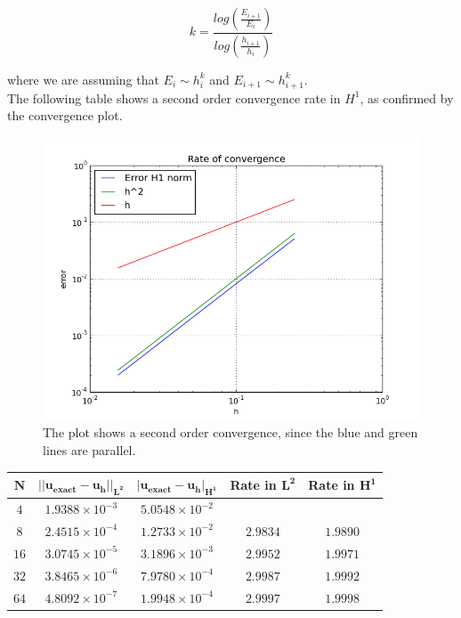 \documentclass[a4paper,11pt,openright,twoside]{book}
\begin{document}
\[
k = \frac{log(\frac{E_{i+1}}{E_i})}{log(\frac{h_{i+1}}{h_i})}
\]

where we are assuming that $E_i \sim h^k_i$ and $E_{i+1} \sim h^k_{i+1}$. \\
The following table shows a second order convergence rate in $H^1$, as confirmed by the convergence plot.

\vspace{1cm}
\begin{figure}[h!]
\centering
\includegraphics[width=\textwidth]{images/convergence_sine}
\caption{The plot shows a second order convergence, since the blue and green lines are parallel.}
\end{figure}
\vspace{1cm}

\begin{center}
\begin{tabular}{| c | c | c | c | c |}
\hline
$  \mathbf{N}$ & $ \mathbf{|| u_{exact} - u_h ||_{L^2}}$ & $  \mathbf{ | u_{exact} - u_h |_{H^1}}$ & \textbf{Rate in }  $ \mathbf{L^2}$ & \textbf{Rate in } $  \mathbf{H^1}$  \\
\hline
$ 4 $ & $1.9388 \times 10^{-3}$ & $5.0548 \times 10^{-2}$  & & \\
\hline
$ 8$ & $2.4515  \times 10^{-4}$ & $1.2733 \times 10^{-2}$ &  $2.9834$ &  $1.9890$   \\
\hline
$ 16 $ & $ 3.0745 \times 10^{-5}$ & $3.1896 \times 10^{-3}$ & $ 2.9952 $ & $1.9971$   \\
\hline
$ 32$ & $3.8465 \times 10^{-6}$ & $7.9780 \times 10^{-4}$ & $ 2.9987 $ & $ 1.9992 $  \\
\hline
$ 64$ & $4.8092 \times 10^{-7}$ & $1.9948 \times 10^{-4}$  & $ 2.9997 $ & $1.9998$ \\
\hline
\end{tabular}
\end{center}
\end{document}
